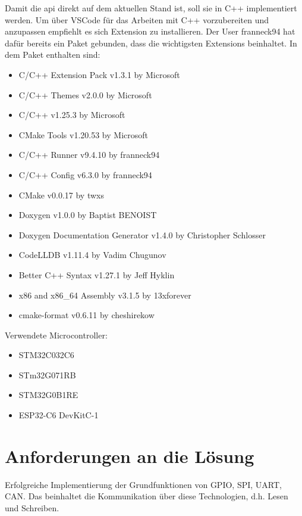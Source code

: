 Damit die \gls{api} direkt auf dem aktuellen Stand ist, soll sie in C++ implementiert werden.
Um über VSCode für das Arbeiten mit C++ vorzubereiten und anzupassen empfiehlt es sich Extension zu installieren.
Der User franneck94 hat dafür bereits ein Paket gebunden, dass die wichtigsten Extensions beinhaltet.
In dem Paket enthalten sind:
\begin{itemize}
	\item C/C++ Extension Pack  v1.3.1 by Microsoft
	\item C/C++ Themes  v2.0.0 by Microsoft
	\item C/C++  v1.25.3  by Microsoft
	\item CMake Tools  v1.20.53  by Microsoft
	\item C/C++ Runner  v9.4.10 by franneck94
	\item C/C++ Config  v6.3.0 by franneck94
	\item CMake  v0.0.17 by twxs
	\item Doxygen  v1.0.0 by Baptist BENOIST
	\item Doxygen Documentation Generator  v1.4.0 by Christopher Schlosser
	\item CodeLLDB  v1.11.4 by Vadim Chugunov
	\item Better C++ Syntax  v1.27.1  by Jeff Hyklin
	\item x86 and x86\_64 Assembly  v3.1.5 by 13xforever
	\item cmake-format  v0.6.11 by cheshirekow
\end{itemize}

Verwendete Microcontroller:
\begin{itemize}
	\item STM32C032C6
	\item STm32G071RB
	\item STM32G0B1RE
	\item ESP32-C6 DevKitC-1
\end{itemize}


\section{Anforderungen an die Lösung}
Erfolgreiche Implementierung der Grundfunktionen 
von GPIO, SPI, UART, CAN. Das beinhaltet die Kommunikation über diese Technologien, d.h. Lesen und Schreiben.


